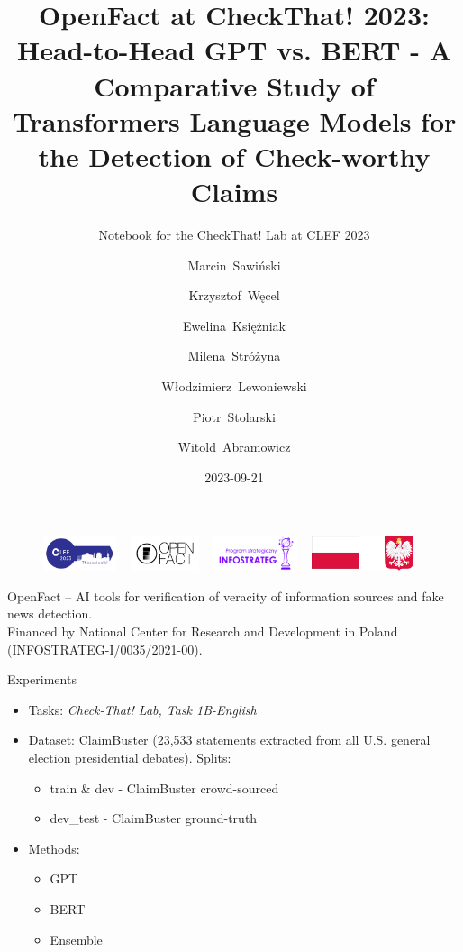 \documentclass[aspectratio=149]{beamer}
\author{Marcin~Sawiński \and 
Krzysztof~Węcel \and 
Ewelina~Księżniak \and 
Milena~Stróżyna \and 
Włodzimierz~Lewoniewski \and
Piotr~Stolarski \and
Witold~Abramowicz}
\date{2023-09-21}
\institute{Poznań University of Economics and Business}
\title{OpenFact at CheckThat! 2023: Head-to-Head GPT vs. BERT - A Comparative Study of Transformers Language Models for the Detection of Check-worthy Claims}
\subtitle{Notebook for the CheckThat! Lab at CLEF 2023}
\begin{document}
\begin{frame}
\begin{figure}
\includegraphics[height=1cm]{logo_clef}
\hspace*{0.5cm}~%
\includegraphics[height=1cm]{logo_openfact}
\hspace*{0.5cm}~%
\includegraphics[height=1cm]{logo_infos.png}
\hspace*{0.5cm}~%
\includegraphics[height=1cm]{logo_godlo_flaga}
\end{figure}
\fontsize{7pt}{7pt}\selectfont
OpenFact -- AI tools for verification of veracity of information sources and fake news detection.\\ Financed by National Center for Research and Development in Poland (INFOSTRATEG-I/0035/2021-00).

\titlepage
\end{frame}
\begin{frame}{Experiments}
\begin{itemize}
  \item Tasks: \emph{Check-That! Lab, Task 1B-English} 
  \item Dataset: ClaimBuster (23,533 statements extracted from all U.S. general election presidential debates). Splits:\begin{itemize}
  \item train \& dev - ClaimBuster crowd-sourced 
  \item dev\_test - ClaimBuster ground-truth
\end{itemize}

  \item Methods:\begin{itemize}
  \item GPT
  \item BERT
  \item Ensemble
\end{itemize}
\end{itemize}
\end{frame}
\end{document}
